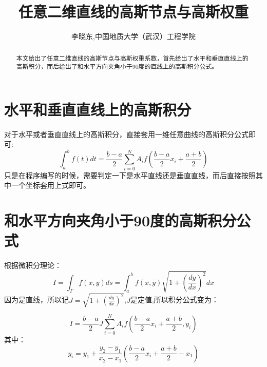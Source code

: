 \documentclass{article}                          %
\title{任意二维直线的高斯节点与高斯权重}
\author{李晓东,中国地质大学（武汉）工程学院}
\numberwithin{equation}{subsection}              %
\begin{document}
	\maketitle
	\begin{abstract}
	本文给出了任意二维直线的高斯节点与高斯权重系数，首先给出了水平和垂直直线上的高斯积分，而后给出了和水平方向夹角小于90度的直线上的高斯积分公式。	
	\end{abstract}

\section{水平和垂直直线上的高斯积分}
对于水平或者垂直直线上的高斯积分，直接套用一维任意曲线的高斯积分公式即可:
\begin{equation}\label{key}
\int_{a}^{b} f(t) dt= \frac{b-a}{2} \sum_{i=0}^{N} A_i f\left(\frac{b-a}{2} x_i+ \frac{a+b}{2} \right)
\end{equation}
只是在程序编写的时候，需要判定一下是水平直线还是垂直直线，而后直接按照其中一个坐标套用上式即可。

\section{和水平方向夹角小于90度的高斯积分公式}
根据微积分理论：
\begin{equation}\label{key}
I=\int_{\Gamma}f(x,y)ds=\int_{a}^{b}f(x,y)\sqrt{1+\left( \frac{dy}{dx}\right) ^2}dx
\end{equation}
因为是直线，所以记$ J=\sqrt{1+\left( \frac{dy}{dx}\right) ^2} $,$ J $是定值,所以积分公式变为：

\begin{equation}\label{key}
I=\frac{b-a}{2} J\sum_{i=0}^{N} A_i f\left(\frac{b-a}{2} x_i+ \frac{a+b}{2} ,y_i \right)
\end{equation}
其中：
\begin{equation}\label{key}
y_i=y_1+\frac{y_2-y_1}{x_2-x_1} (\frac{b-a}{2} x_i+ \frac{a+b}{2}-x_1)
\end{equation}
\end{document}
